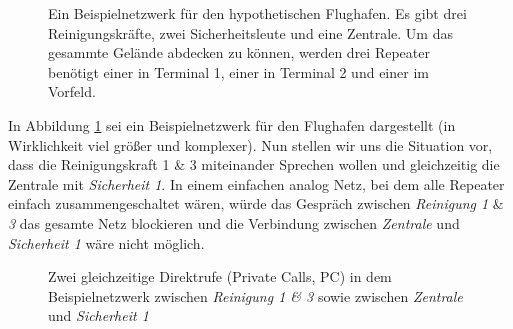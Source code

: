 \begin{figure}[!ht]
 \centering
 \caption{Ein Beispielnetzwerk für den hypothetischen Flughafen. Es gibt drei Reinigungskräfte, zwei Sicherheitsleute und eine Zentrale. Um das gesammte Gelände abdecken zu können, werden drei Repeater benötigt einer in Terminal 1, einer in Terminal 2 und einer im Vorfeld.} \label{fig:exnet1}
\end{figure}

In Abbildung \ref{fig:exnet1} sei ein Beispielnetzwerk für den Flughafen dargestellt (in Wirklichkeit viel größer und komplexer). Nun stellen wir uns die Situation vor, dass die Reinigungskraft 1 \& 3 miteinander Sprechen wollen und gleichzeitig die Zentrale mit \emph{Sicherheit 1}. In einem einfachen analog Netz, bei dem alle Repeater einfach zusammengeschaltet wären, würde das Gespräch zwischen \emph{Reinigung 1} \& \emph{3} das gesamte Netz blockieren und die Verbindung zwischen \emph{Zentrale} und \emph{Sicherheit 1} wäre nicht möglich. 

\begin{figure}[!ht]
 \centering
 \caption{Zwei gleichzeitige Direktrufe (Private Calls, PC) in dem Beispielnetzwerk zwischen \emph{Reinigung 1 \& 3} sowie zwischen \emph{Zentrale} und \emph{Sicherheit 1}} \label{fig:exnet2}
\end{figure}

